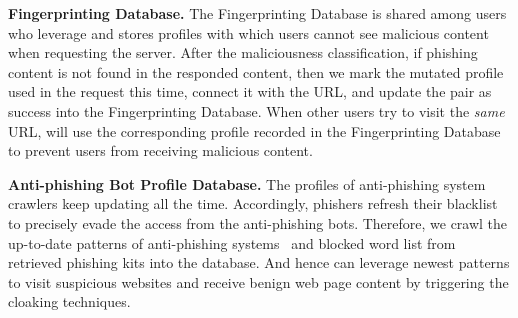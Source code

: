 \noindent
\textbf{Fingerprinting Database.}
The Fingerprinting Database is shared among users who leverage \spartacus and stores profiles with which users cannot see malicious content when requesting the server.
After the maliciousness classification, if phishing content is not found in the responded content, then we mark the mutated profile used in the request this time, connect it with the URL, and update the pair as success into the Fingerprinting Database.
When other users try to visit the \emph{same} URL, \spartacus will use the corresponding profile recorded in the Fingerprinting Database to prevent users from receiving malicious content.

\noindent
\textbf{Anti-phishing Bot Profile Database.}
The profiles of anti-phishing system crawlers keep updating all the time.
Accordingly, phishers refresh their blacklist to precisely evade the access from the anti-phishing bots.
Therefore, we crawl the up-to-date patterns of anti-phishing systems~\cite{crawlerinfo} and blocked word list from retrieved phishing kits into the database.
And hence \spartacus can leverage newest patterns to visit suspicious websites and receive benign web page content by triggering the cloaking techniques.






